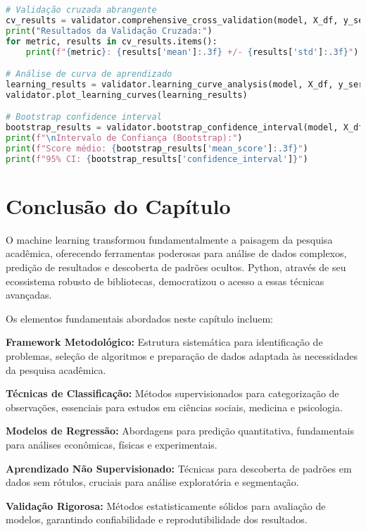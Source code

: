 \begin{pythonbox}
\begin{lstlisting}[language=Python]  
# Validação cruzada abrangente
cv_results = validator.comprehensive_cross_validation(model, X_df, y_series)
print("Resultados da Validação Cruzada:")
for metric, results in cv_results.items():
    print(f"{metric}: {results['mean']:.3f} +/- {results['std']:.3f}")

# Análise de curva de aprendizado
learning_results = validator.learning_curve_analysis(model, X_df, y_series)
validator.plot_learning_curves(learning_results)

# Bootstrap confidence interval
bootstrap_results = validator.bootstrap_confidence_interval(model, X_df, y_series)
print(f"\nIntervalo de Confiança (Bootstrap):")
print(f"Score médio: {bootstrap_results['mean_score']:.3f}")
print(f"95% CI: {bootstrap_results['confidence_interval']}")
\end{lstlisting}
\end{pythonbox}

\section{Conclusão do Capítulo}

O machine learning transformou fundamentalmente a paisagem da pesquisa acadêmica, oferecendo ferramentas poderosas para análise de dados complexos, predição de resultados e descoberta de padrões ocultos. Python, através de seu ecossistema robusto de bibliotecas, democratizou o acesso a essas técnicas avançadas.

Os elementos fundamentais abordados neste capítulo incluem:

\textbf{Framework Metodológico:} Estrutura sistemática para identificação de problemas, seleção de algoritmos e preparação de dados adaptada às necessidades da pesquisa acadêmica.

\textbf{Técnicas de Classificação:} Métodos supervisionados para categorização de observações, essenciais para estudos em ciências sociais, medicina e psicologia.

\textbf{Modelos de Regressão:} Abordagens para predição quantitativa, fundamentais para análises econômicas, físicas e experimentais.

\textbf{Aprendizado Não Supervisionado:} Técnicas para descoberta de padrões em dados sem rótulos, cruciais para análise exploratória e segmentação.

\textbf{Validação Rigorosa:} Métodos estatisticamente sólidos para avaliação de modelos, garantindo confiabilidade e reprodutibilidade dos resultados.

